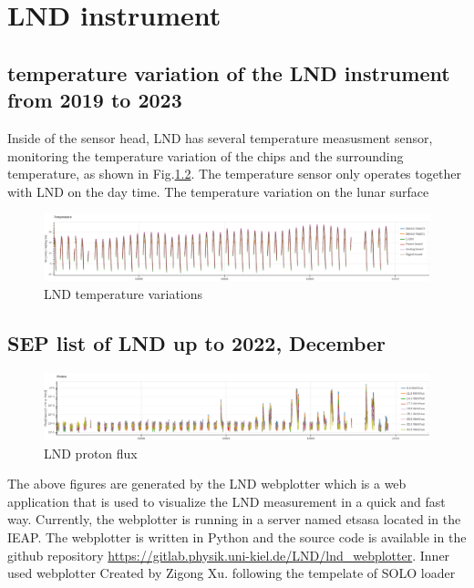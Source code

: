 \chapter{LND instrument}
\label{chp:GCS_Python}

\section{temperature variation of the LND instrument from 2019 to 2023}

Inside of the sensor head, LND has several temperature measusment sensor, monitoring the temperature variation of the chips and the surrounding temperature, as shown in Fig.\ref{}. The temperature sensor only operates together with LND on the day time. 
The temperature variation on the lunar surface

\begin{figure}
    \centering
    \includegraphics{images/lnd_temperature.png}
    \caption{LND temperature variations}
    \label{}
\end{figure}


\section{SEP list of LND up to 2022, December}

\begin{figure}
    \centering
    \includegraphics{images/lnd_proton_flux.png}
    \caption{LND proton flux}
    \label{}
\end{figure}

The above figures are generated by the LND webplotter which is a web application that is used to visualize the LND measurement in a quick and fast way. 
Currently, the webplotter is running in a server named etsasa located in the IEAP.
The webplotter is written in Python and the source code is available in the github repository \url{https://gitlab.physik.uni-kiel.de/LND/lnd_webplotter}. 
Inner used webplotter 
Created by Zigong Xu. following the tempelate of SOLO loader

